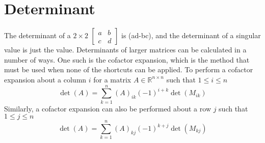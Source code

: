 \documentclass{report}
\begin{document}
\section{Determinant}
\noindent The determinant of a $2\times2$ $\begin{bmatrix}a&b\\c&d\end{bmatrix}$ is (ad-bc), and the determinant of a singular value is just the value. Determinants of larger matrices can be calculated in a number of ways. One such is the cofactor expansion, which is the method that must be used when none of the shortcuts can be applied.
\noindent To perform a cofactor expansion about a column $i$ for a matrix $A\in\mathbb{R}^{n\times n}$ such that $1 \le i \le n$
$$
\det(A) = \sum_{k=1}^n (A)_{ik}(-1)^{i+k} \det(M_{ik})
$$
Similarly, a cofactor expansion can also be performed about a row $j$ such that $1 \le j \le n$
$$
\det(A) = \sum_{k=1}^n (A)_{kj}(-1)^{k+j} \det(M_{kj})
$$
\end{document}
